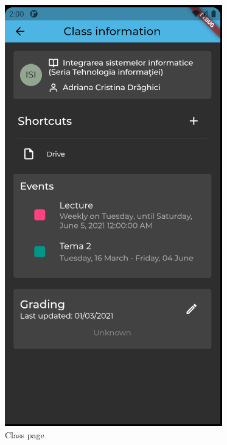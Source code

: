 \begin{figure}[!ht]
    \hfill
    \begin{minipage}[b]{0.35\textwidth}
        \captionsetup{justification=centering}
        \includegraphics[width=\textwidth]{figures/ss/image4.png}
        \caption{Class page}
        \label{5:fig:fclass}
    \end{minipage}
    
\end{figure}

